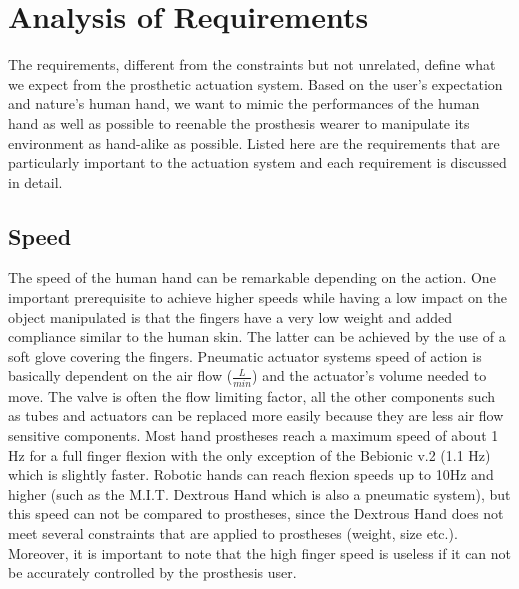 \documentclass[main]{subfiles}
\begin{document}
\section{Analysis of Requirements}
The requirements, different from the constraints but not unrelated, define what we expect from the prosthetic actuation system. Based on the user's expectation and nature's human hand, we want to mimic the performances of the human hand as well as possible to reenable the prosthesis wearer to manipulate its environment as hand-alike as possible. Listed here are the requirements that are particularly important to the actuation system and each requirement is discussed in detail.

\subsection{Speed}

The speed of the human hand can be remarkable depending on the action. One important prerequisite to achieve higher speeds while having a low impact on the object manipulated is that the fingers have a very low weight and added compliance similar to the human skin. The latter can be achieved by the use of a soft glove covering the fingers. Pneumatic actuator systems speed of action is basically dependent on the air flow ($\frac{L}{min}$) and the actuator's volume needed to move. The valve is often the flow limiting factor, all the other components such as tubes and actuators can be replaced more easily because they are less air flow sensitive components. Most hand prostheses reach a maximum speed of about 1 Hz for a full finger flexion with the only exception of the Bebionic v.2 (1.1 Hz) which is slightly faster. Robotic hands can reach flexion speeds up to 10Hz and higher (such as the M.I.T. Dextrous Hand which is also a pneumatic system), but this speed can not be compared to prostheses, since the Dextrous Hand does not meet several constraints that are applied to prostheses (weight, size etc.). Moreover, it is important to note that the high finger speed is useless if it can not be accurately controlled by the prosthesis user.
\end{document}
